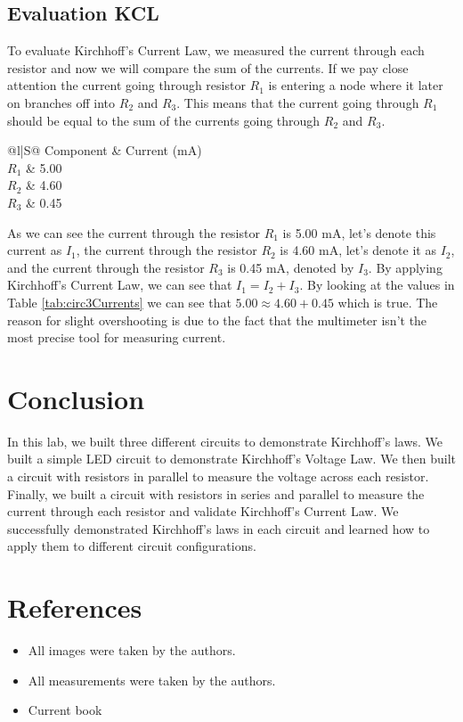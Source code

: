 \documentclass[a4paper, 10pt]{article}
\begin{document}
		\subsection{Evaluation KCL}
			To evaluate Kirchhoff's Current Law, we measured the current through each resistor and now we will compare the sum of the currents.
			If we pay close attention the current going through resistor $R_1$ is entering a node where it later on branches off into $R_2$ and $R_3$.
			This means that the current going through $R_1$ should be equal to the sum of the currents going through $R_2$ and $R_3$.

			\begin{table}[h!]
				\centering
				\begin{tabular}{@{}l|S@{}} %
					\toprule
					{Component} & {Current (\si{\milli\ampere})} \\
					\midrule
					$R_1$ & 5.00 \\ \hline
					$R_2$ & 4.60 \\ \hline
					$R_3$ & 0.45 \\ \hline
					\bottomrule
				\end{tabular}
				\caption{Current through each resistor}
				\label{tab:circ3Currents}
			\end{table}

			As we can see the current through the resistor $R_1$ is 5.00 mA, let's denote this current as $I_1$, the current through the resistor $R_2$ is 4.60 mA, let's denote it
			as $I_2$, and the current through the resistor $R_3$ is 0.45 mA, denoted by $I_3$.
			By applying Kirchhoff's Current Law, we can see that $I_1 = I_2 + I_3$.
			By looking at the values in Table \ref{tab:circ3Currents} we can see that $5.00 \approx 4.60 + 0.45$ which is true.
			The reason for slight overshooting is due to the fact that the multimeter isn't the most precise tool for measuring current.
			\pagebreak

	\section{Conclusion}
		In this lab, we built three different circuits to demonstrate Kirchhoff's laws. 
		We built a simple LED circuit to demonstrate Kirchhoff's Voltage Law. 
		We then built a circuit with resistors in parallel to measure the voltage across each resistor. 
		Finally, we built a circuit with resistors in series and parallel to measure the current through each resistor and validate Kirchhoff's Current Law.
		We successfully demonstrated Kirchhoff's laws in each circuit and learned how to apply them to different circuit configurations.

	\section{References}
		\begin{itemize}
			\item All images were taken by the authors.
			\item All measurements were taken by the authors.
			\item Current book
		\end{itemize}
\end{document}

